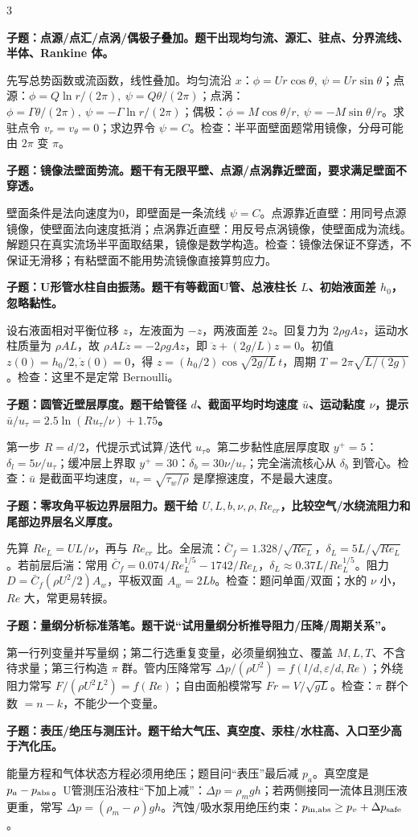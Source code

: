 \documentclass[a4paper]{article}
\newcommand{\qt}[1]{\vspace{0.04pt}\colorbox{Q}{\parbox{\dimexpr\linewidth-2\fboxsep}{\color{white}\bfseries #1}}\par}
\newcommand{\ans}[1]{\colorbox{G}{\parbox{\dimexpr\linewidth-2\fboxsep}{#1}}\par}
\begin{document}
\begin{multicols}{3}
\qt{子题：点源/点汇/点涡/偶极子叠加。题干出现均匀流、源汇、驻点、分界流线、半体、Rankine 体。}
\ans{先写总势函数或流函数，线性叠加。均匀流沿 $x$：$\phi=Ur\cos\theta,\ \psi=Ur\sin\theta$；点源：$\phi=Q\ln r/(2\pi),\ \psi=Q\theta/(2\pi)$；点涡：$\phi=\Gamma\theta/(2\pi),\ \psi=-\Gamma\ln r/(2\pi)$；偶极：$\phi=M\cos\theta/r,\ \psi=-M\sin\theta/r$。求驻点令 $v_r=v_\theta=0$；求边界令 $\psi=C$。检查：半平面壁面题常用镜像，分母可能由 $2\pi$ 变 $\pi$。}
\qt{子题：镜像法壁面势流。题干有无限平壁、点源/点涡靠近壁面，要求满足壁面不穿透。}
\ans{壁面条件是法向速度为0，即壁面是一条流线 $\psi=C$。点源靠近直壁：用同号点源镜像，使壁面法向速度抵消；点涡靠近直壁：用反号点涡镜像，使壁面成为流线。解题只在真实流场半平面取结果，镜像是数学构造。检查：镜像法保证不穿透，不保证无滑移；有粘壁面不能用势流镜像直接算剪应力。}
\qt{子题：U形管水柱自由振荡。题干有等截面U管、总液柱长 $L$、初始液面差 $h_0$，忽略黏性。}
\ans{设右液面相对平衡位移 $z$，左液面为 $-z$，两液面差 $2z$。回复力为 $2\rho gAz$，运动水柱质量为 $\rho AL$，故 $\rho AL\ddot z=-2\rho gAz$，即 $\ddot z+(2g/L)z=0$。初值 $z(0)=h_0/2,\dot z(0)=0$，得 $z=(h_0/2)\cos\sqrt{2g/L}\,t$，周期 $T=2\pi\sqrt{L/(2g)}$。检查：这里不是定常 Bernoulli。}
\qt{子题：圆管近壁层厚度。题干给管径 $d$、截面平均时均速度 $\bar u$、运动黏度 $\nu$，提示 $\bar u/u_\tau=2.5\ln(Ru_\tau/\nu)+1.75$。}
\ans{第一步 $R=d/2$，代提示式试算/迭代 $u_\tau$。第二步黏性底层厚度取 $y^+=5$：$\delta_l=5\nu/u_\tau$；缓冲层上界取 $y^+=30$：$\delta_b=30\nu/u_\tau$；完全湍流核心从 $\delta_b$ 到管心。检查：$\bar u$ 是截面平均速度，$u_\tau=\sqrt{\tau_w/\rho}$ 是摩擦速度，不是最大速度。}
\qt{子题：零攻角平板边界层阻力。题干给 $U,L,b,\nu,\rho,Re_{cr}$，比较空气/水绕流阻力和尾部边界层名义厚度。}
\ans{先算 $Re_L=UL/\nu$，再与 $Re_{cr}$ 比。全层流：$\bar C_f=1.328/\sqrt{Re_L}$，$\delta_L=5L/\sqrt{Re_L}$。若前层后湍：常用 $\bar C_f=0.074/Re_L^{1/5}-1742/Re_L$，$\delta_L\approx0.37L/Re_L^{1/5}$。阻力 $D=\bar C_f(\rho U^2/2)A_w$，平板双面 $A_w=2Lb$。检查：题问单面/双面；水的 $\nu$ 小，$Re$ 大，常更易转捩。}
\qt{子题：量纲分析标准落笔。题干说“试用量纲分析推导阻力/压降/周期关系”。}
\ans{第一行列变量并写量纲；第二行选重复变量，必须量纲独立、覆盖 $M,L,T$、不含待求量；第三行构造 $\pi$ 群。管内压降常写 $\Delta p/(\rho U^2)=f(l/d,\varepsilon/d,Re)$；外绕阻力常写 $F/(\rho U^2L^2)=f(Re)$；自由面船模常写 $Fr=V/\sqrt{gL}$。检查：$\pi$ 群个数 $=n-k$，不能少一个变量。}
\qt{子题：表压/绝压与测压计。题干给大气压、真空度、汞柱/水柱高、入口至少高于汽化压。}
\ans{能量方程和气体状态方程必须用绝压；题目问“表压”最后减 $p_a$。真空度是 $p_a-p_{\rm abs}$。U管测压沿液柱“下加上减”：$\Delta p=\rho_mgh$；若两侧接同一流体且测压液更重，常写 $\Delta p=(\rho_m-\rho)gh$。汽蚀/吸水泵用绝压约束：$p_{\rm in,abs}\ge p_v+\Delta p_{\rm safe}$。}

\end{multicols}
\end{document}
